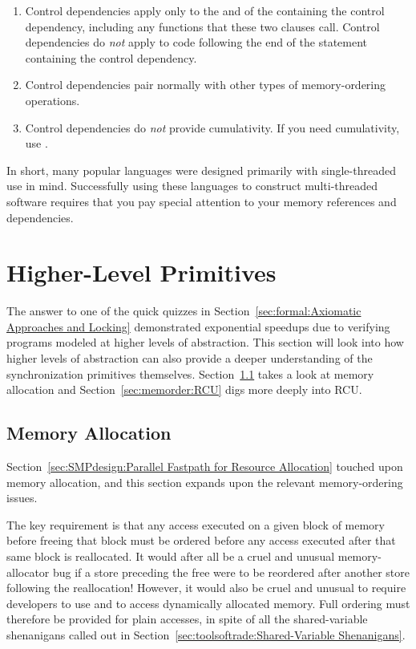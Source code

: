 \begin{enumerate}
\item	Control dependencies apply only to the  and
	 of the  containing the control
	dependency, including any functions that these two clauses call.
	Control dependencies do \emph{not} apply to code following the
	end of the  statement containing the control dependency.

\item	Control dependencies pair normally with other types of
	memory-ordering operations.

\item	Control dependencies do \emph{not} provide cumulativity.
	If you need cumulativity, use .
\end{enumerate}

In short, many popular languages were designed primarily with
single-threaded use in mind.
Successfully using these languages to construct multi-threaded software
requires that you pay special attention to your memory references and
dependencies.

\section{Higher-Level Primitives}
\label{sec:memorder:Higher-Level Primitives}

The answer to one of the quick quizzes in
Section~\ref{sec:formal:Axiomatic Approaches and Locking}
demonstrated exponential speedups due to verifying programs
modeled at higher levels of abstraction.
This section will look into how higher levels of abstraction can
also provide a deeper understanding of the synchronization primitives
themselves.
Section~\ref{sec:memorder:Memory Allocation}
takes a look at memory allocation and
Section~\ref{sec:memorder:RCU}
digs more deeply into RCU.

\subsection{Memory Allocation}
\label{sec:memorder:Memory Allocation}

Section~\ref{sec:SMPdesign:Parallel Fastpath for Resource Allocation}
touched upon memory allocation, and this section expands upon the relevant
memory-ordering issues.

The key requirement is that any access executed on a given block of
memory before freeing that block must be ordered before any access
executed after that same block is reallocated.
It would after all be a cruel and unusual memory-allocator bug if a store
preceding the free were to be reordered after another store following
the reallocation!
However, it would also be cruel and unusual to require developers to use
 and  to access dynamically allocated
memory.
Full ordering must therefore be provided for plain accesses, in spite of
all the shared-variable shenanigans called out in
Section~\ref{sec:toolsoftrade:Shared-Variable Shenanigans}.

